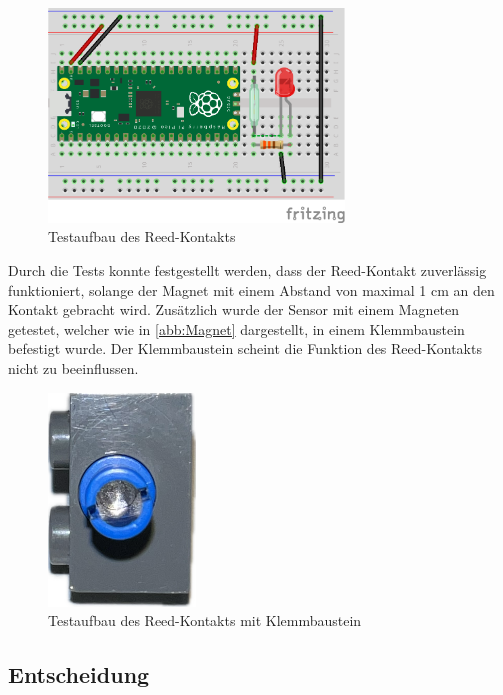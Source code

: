 \begin{figure}[H]
    \centering
    \includegraphics[width=0.7\textwidth]{Assets/Images/4-Entwicklung-der-GFA/Reed-Test1_bb.png}
    \caption{Testaufbau des Reed-Kontakts}\label{abb:Reed-Kontakt}
\end{figure}

Durch die Tests konnte festgestellt werden, dass der Reed-Kontakt zuverlässig funktioniert, solange der Magnet mit einem Abstand von maximal 1 cm an den Kontakt gebracht wird. Zusätzlich wurde der Sensor mit einem Magneten getestet, welcher wie in \autoref{abb:Magnet} dargestellt, in einem Klemmbaustein befestigt wurde. Der Klemmbaustein scheint die Funktion des Reed-Kontakts nicht zu beeinflussen.

\begin{figure}[H]
    \centering
    \includegraphics[width=0.35\textwidth]{Assets/Images/4-Entwicklung-der-GFA/Magnet.png}
    \caption{Testaufbau des Reed-Kontakts mit Klemmbaustein}\label{abb:Magnet}
\end{figure}

\subsection{Entscheidung}\label{text:Entwicklung-der-GFA:Achszähler:Entscheidung}


